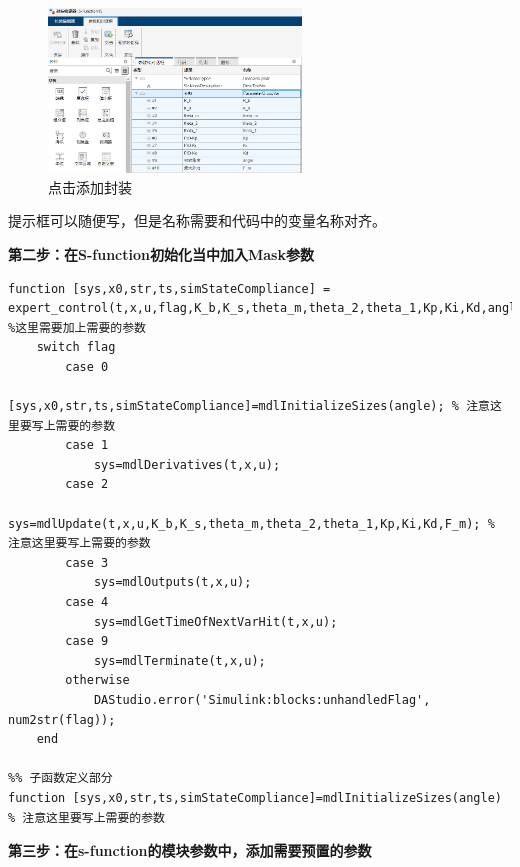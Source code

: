 \documentclass[12pt,a4paper,UTF8]{article}
\begin{document}
\begin{figure}[h]
    \centering
    \includegraphics[width=0.6\textwidth]{20241203115132.png}
    \caption{点击添加封装}
\end{figure}

提示框可以随便写，但是名称需要和代码中的变量名称对齐。

\textbf{第二步：在S-function初始化当中加入Mask参数}

\begin{lstlisting}
function [sys,x0,str,ts,simStateCompliance] = expert_control(t,x,u,flag,K_b,K_s,theta_m,theta_2,theta_1,Kp,Ki,Kd,angle,F_m) %这里需要加上需要的参数
    switch flag
        case 0
            [sys,x0,str,ts,simStateCompliance]=mdlInitializeSizes(angle); % 注意这里要写上需要的参数
        case 1
            sys=mdlDerivatives(t,x,u);
        case 2
            sys=mdlUpdate(t,x,u,K_b,K_s,theta_m,theta_2,theta_1,Kp,Ki,Kd,F_m); % 注意这里要写上需要的参数
        case 3
            sys=mdlOutputs(t,x,u);
        case 4
            sys=mdlGetTimeOfNextVarHit(t,x,u);
        case 9
            sys=mdlTerminate(t,x,u);
        otherwise
            DAStudio.error('Simulink:blocks:unhandledFlag', num2str(flag));
    end

%% 子函数定义部分
function [sys,x0,str,ts,simStateCompliance]=mdlInitializeSizes(angle) % 注意这里要写上需要的参数
\end{lstlisting}

\textbf{第三步：在s-function的模块参数中，添加需要预置的参数}
\end{document}
